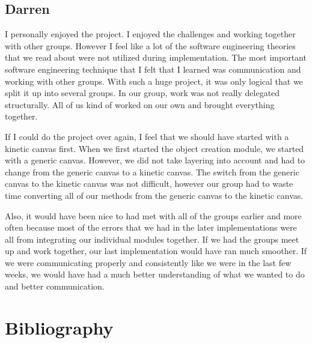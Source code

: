 \documentclass[a4paper, 11pt]{article} %
\begin{document}
\subsection{Darren}
I personally enjoyed the project. I enjoyed the challenges and working together with other groups. However I feel like a lot of the software engineering theories that we read about were not utilized during implementation. The most important software engineering technique that I felt that I learned was communication and working with other groups. With such a huge project, it was only logical that we split it up into several groups. In our group, work was not really delegated structurally. All of us kind of worked on our own and brought everything together. 

If I could do the project over again, I feel that we should have started with a kinetic canvas first. When we first started the object creation module, we started with a generic canvas. However, we did not take layering into account and had to change from the generic canvas to a kinetic canvas. The switch from the generic canvas to the kinetic canvas was not difficult, however our group had to waste time converting all of our methods from the generic canvas to the kinetic canvas.  

Also, it would have been nice to had met with all of the groups earlier and more often because most of the errors that we had in the later implementations were all from integrating our individual modules together. If we had the groups meet up and work together, our last implementation would have ran much smoother. If we were communicating properly and consistently like we were in the last few weeks, we would have had a much better understanding of what we wanted to do and better communication. 







\newpage
\section*{Bibliography}


\end{document}
